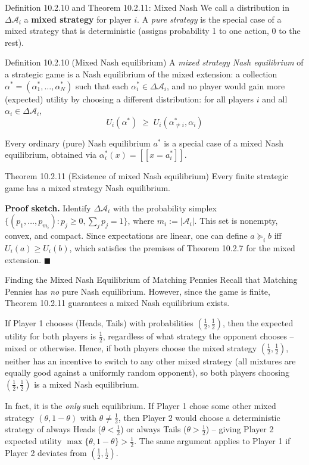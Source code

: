 \documentclass[aspectratio=169,10pt]{beamer}
\newcommand{\Ac}{\mathcal{A}}
\begin{document}
\begin{frame}{Definition 10.2.10 and Theorem 10.2.11: Mixed Nash}
  We call a distribution in $\Delta\Ac_i$ a \textbf{mixed strategy} for
  player $i$. A \emph{pure strategy} is the special case of a mixed
  strategy that is deterministic (assigns probability 1 to one action, 0
  to the rest).

  \begin{block}{Definition 10.2.10 (Mixed Nash equilibrium)}
    A \emph{mixed strategy Nash equilibrium} of a strategic game is a
    Nash equilibrium of the mixed extension: a collection
    $\alpha^*=(\alpha_1^*,\ldots,\alpha_N^*)$ such that each
    $\alpha_i^*\in\Delta\Ac_i$, and no player would gain more (expected)
    utility by choosing a different distribution: for all players $i$ and
    all $\alpha_i\in\Delta\Ac_i$,
    \[
      U_i(\alpha^*) \;\geq\; U_i(\alpha^*_{\neq i},\alpha_i)
    \]
  \end{block}
  Every ordinary (pure) Nash equilibrium $a^*$ is a special case of a
  mixed Nash equilibrium, obtained via $\alpha_i^*(x)=[\![x=a_i^*]\!]$.

  \begin{block}{Theorem 10.2.11 (Existence of mixed Nash equilibrium)}
    Every finite strategic game has a mixed strategy Nash equilibrium.
  \end{block}
  \textbf{Proof sketch.} Identify $\Delta\Ac_i$ with the probability
  simplex $\{(p_1,\ldots,p_{m_i}):p_j\geq0,\sum_j p_j=1\}$, where
  $m_i:=|\Ac_i|$. This set is nonempty, convex, and compact. Since
  expectations are linear, one can define $a\succeq_i b$ iff
  $U_i(a)\geq U_i(b)$, which satisfies the premises of Theorem 10.2.7 for
  the mixed extension. $\blacksquare$
\end{frame}

\begin{frame}{Finding the Mixed Nash Equilibrium of Matching Pennies}
  Recall that Matching Pennies has \emph{no} pure Nash equilibrium.
  However, since the game is finite, Theorem 10.2.11 guarantees a mixed
  Nash equilibrium exists.

  \vspace{0.3em}
  If Player 1 chooses (Heads, Tails) with probabilities
  $(\tfrac12,\tfrac12)$, then the expected utility for both players is
  $\tfrac12$, regardless of what strategy the opponent chooses -- mixed or
  otherwise. Hence, if both players choose the mixed strategy
  $(\tfrac12,\tfrac12)$, neither has an incentive to switch to any other
  mixed strategy (all mixtures are equally good against a uniformly
  random opponent), so both players choosing $(\tfrac12,\tfrac12)$ is a
  mixed Nash equilibrium.

  \vspace{0.3em}
  In fact, it is the \emph{only} such equilibrium. If Player 1 chose some
  other mixed strategy $(\theta,1-\theta)$ with $\theta\neq\tfrac12$, then
  Player 2 would choose a deterministic strategy of always Heads
  ($\theta<\tfrac12$) or always Tails ($\theta>\tfrac12$) -- giving Player
  2 expected utility $\max\{\theta,1-\theta\}>\tfrac12$. The same argument
  applies to Player 1 if Player 2 deviates from $(\tfrac12,\tfrac12)$.
\end{frame}
\end{document}
